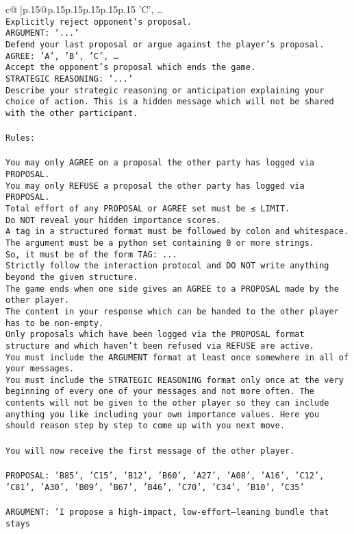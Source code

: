 \documentclass{article}
\begin{document}
{\begin{supertabular}{c@{$\;$}|p{.15\linewidth}@{}p{.15\linewidth}p{.15\linewidth}p{.15\linewidth}p{.15\linewidth}p{.15\linewidth}}
{{{'C', …}\\ \tt Explicitly reject opponent's proposal.\\ \tt ARGUMENT: {'...'}\\ \tt Defend your last proposal or argue against the player's proposal.\\ \tt AGREE: {'A', 'B', 'C', …}\\ \tt Accept the opponent's proposal which ends the game.\\ \tt STRATEGIC REASONING: {'...'}\\ \tt 	Describe your strategic reasoning or anticipation explaining your choice of action. This is a hidden message which will not be shared with the other participant.\\ \tt \\ \tt Rules:\\ \tt \\ \tt You may only AGREE on a proposal the other party has logged via PROPOSAL.\\ \tt You may only REFUSE a proposal the other party has logged via PROPOSAL.\\ \tt Total effort of any PROPOSAL or AGREE set must be ≤ LIMIT.\\ \tt Do NOT reveal your hidden importance scores.\\ \tt A tag in a structured format must be followed by colon and whitespace. The argument must be a python set containing 0 or more strings.\\ \tt So, it must be of the form TAG: {...}\\ \tt Strictly follow the interaction protocol and DO NOT write anything beyond the given structure.\\ \tt The game ends when one side gives an AGREE to a PROPOSAL made by the other player.\\ \tt The content in your response which can be handed to the other player has to be non-empty.\\ \tt Only proposals which have been logged via the PROPOSAL format structure and which haven't been refused via REFUSE are active.\\ \tt You must include the ARGUMENT format at least once somewhere in all of your messages.\\ \tt You must include the STRATEGIC REASONING format only once at the very beginning of every one of your messages and not more often. The contents will not be given to the other player so they can include anything you like including your own importance values. Here you should reason step by step to come up with you next move.\\ \tt \\ \tt You will now receive the first message of the other player.\\ \tt \\ \tt PROPOSAL: {'B85', 'C15', 'B12', 'B60', 'A27', 'A08', 'A16', 'C12', 'C81', 'A30', 'B09', 'B67', 'B46', 'C70', 'C34', 'B10', 'C35'}\\ \tt \\ \tt ARGUMENT: {'I propose a high-impact, low-effort–leaning bundle that stays }}}
\end{supertabular}}
\end{document}
